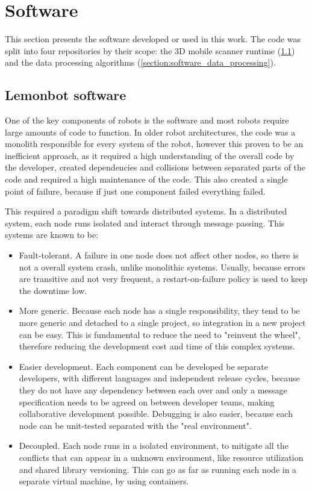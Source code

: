 \section{Software}
\label{section:software}

This section presents the software developed or used in this work. The code was split into four repositories by their scope: the 3D mobile scanner runtime (\cref{section:software_lemonbot_software}) and the data processing algorithms (\cref{section:software_data_processing}).

\subsection{Lemonbot software}
\label{section:software_lemonbot_software}

One of the key components of robots is the software and most robots require large amounts of code to function. In older robot architectures, the code was a monolith responsible for every system of the robot, however this proven to be an inefficient approach, as it required a high understanding of the overall code by the developer, created dependencies and collisions between separated parts of the code and required a high maintenance of the code. This also created a single point of failure, because if just one component failed everything failed. 

This required a paradigm shift towards distributed systems. In a distributed system, each node runs isolated and interact through message passing. This systems are known to be:

\begin{itemize}
    \item Fault-tolerant. A failure in one node does not affect other nodes, so there is not a overall system crash, unlike monolithic systems. Usually, because errors are transitive and not very frequent, a restart-on-failure policy is used to keep the downtime low.
    \item More generic. Because each node has a single responsibility, they tend to be more generic and detached to a single project, so integration in a new project can be easy. This is fundamental to reduce the need to "reinvent the wheel", therefore reducing the development cost and time of this complex systems.
    \item Easier development. Each component can be developed be separate developers, with different languages and independent release cycles, because they do not have any dependency between each over and only a message specification needs to be agreed on between developer teams, making collaborative development possible. Debugging is also easier, because each node can be unit-tested separated with the "real environment".
    \item Decoupled. Each node runs in a isolated environment, to mitigate all the conflicts that can appear in a unknown environment, like resource utilization and shared library versioning. This can go as far as running each node in a separate virtual machine, by using containers.
\end{itemize}

